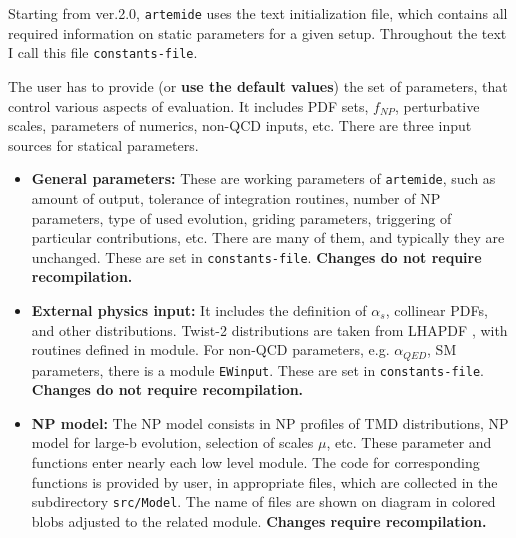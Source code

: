 \documentclass[prd,nofootinbib,eqsecnum,final]{revtex4}
\renewcommand{\(}{\left(}
\renewcommand{\)}{\right)}
\renewcommand{\[}{\left[}
\renewcommand{\]}{\right]}
\newcommand{\red}[1]{{\color[rgb]{1,0,0} #1}}
\begin{document}
\begin{tcolorbox}
Starting from ver.2.0, \texttt{artemide} uses the text initialization file, which contains all required information on static parameters for a given setup. Throughout the text I call this file \texttt{constants-file}.
\end{tcolorbox}

The user has to provide (or \textbf{use the default values}) the set of parameters, that control various aspects of evaluation. It includes PDF sets, $f_{NP}$, perturbative scales, parameters of numerics, non-QCD inputs, etc.  There are three input sources for statical parameters.

\begin{itemize}
\item[~] \textbf{General parameters:} These are working parameters of \texttt{artemide}, such as amount of output, tolerance of integration routines, number of NP parameters, type of used evolution, griding parameters, triggering of particular contributions, etc. There are many of them, and typically they are unchanged. These are set in \texttt{constants-file}. \textbf{Changes do not require recompilation.}
\item[~] \textbf{External physics input:} It includes the definition of $\alpha_s$, collinear PDFs, and other distributions. Twist-2 distributions are taken from LHAPDF \cite{Buckley:2014ana}, with routines defined in  module. For non-QCD parameters, e.g. $\alpha_{QED}$, SM parameters, there is a module \texttt{EWinput}. These are set in \texttt{constants-file}. \textbf{Changes do not require recompilation.}
\item[~] \textbf{NP model:} The NP model consists in NP profiles of TMD distributions, NP model for large-b evolution, selection of scales $\mu$, etc. These parameter and functions enter nearly each low level module. The code for corresponding functions is provided by user, in appropriate files, which are collected in the subdirectory \texttt{src/Model}. The name of files are shown on diagram in colored blobs adjusted to the related module. \red{\textbf{Changes require recompilation.}}
\end{itemize}
\end{document}
